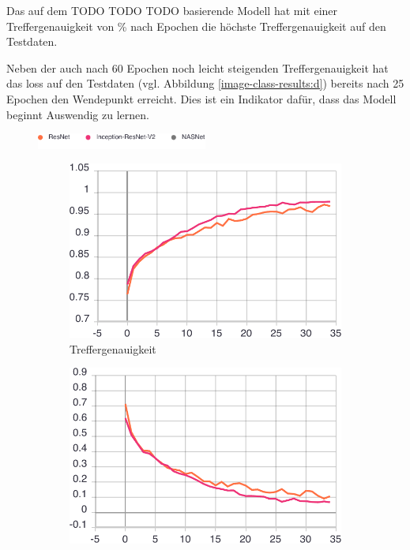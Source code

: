 Das auf dem TODO TODO TODO basierende Modell hat mit einer Treffergenauigkeit von \% nach  Epochen die höchste Treffergenauigkeit auf den Testdaten. 

Neben der auch nach 60 Epochen noch leicht steigenden Treffergenauigkeit hat das loss auf den Testdaten (vgl. Abbildung \ref{image-class-results:d}) bereits nach 25 Epochen den Wendepunkt erreicht. Dies ist ein Indikator dafür, dass das Modell beginnt Auswendig zu lernen.

\begin{figure}[ht] 
  \captionsetup{width=.8\linewidth}
  \caption{Statistiken aus dem Training der Bild-basierten Klassifizierung von Rechnungen mit den ResNet, Inception-ResNetV2 und NASNet Netzwerken.}
  \label{image-class-results} 
  \includegraphics[width=0.5\textwidth]{graphics/image-classification-results/legend.pdf}
  \begin{subfigure}[b]{0.5\linewidth}
    \centering
    \includegraphics[width=0.75\linewidth]{graphics/image-classification-results/acc.pdf} 
    \caption{Treffergenauigkeit} 
    \label{image-class-results:a} 
    \vspace{2ex}
  \end{subfigure}%
  \begin{subfigure}[b]{0.5\linewidth}
    \centering
    \includegraphics[width=0.75\linewidth]{graphics/image-classification-results/loss.pdf} 

\end{subfigure}
\end{figure}
